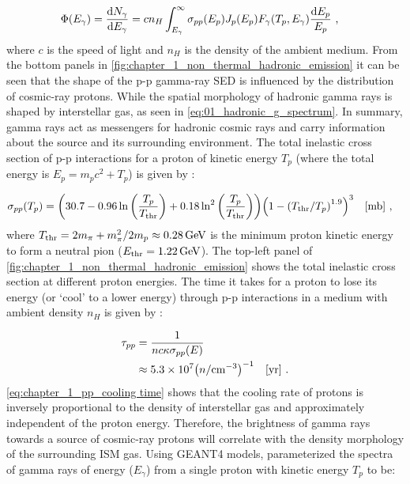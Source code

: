 \begin{equation}
    \begin{aligned}
	\Phi\qty(E_\gamma)&=\dv{N_\gamma}{E_\gamma}=cn_H\int_{E_\gamma}^\infty\sigma_{pp}\qty(E_p)J_p\qty(E_p)F_\gamma\qty(T_p,E_\gamma)\frac{\dd{E_p}}{E_p}\text{ ,}
\end{aligned} \label{eq:01_hadronic_g_spectrum}
\end{equation}
\noindent where $c$ is the speed of light and $n_H$ is the density of the ambient medium.
From the bottom panels in \autoref{fig:chapter_1_non_thermal_hadronic_emission} it can be seen that the shape of the p-p gamma-ray SED is influenced by the distribution of cosmic-ray protons. While the spatial morphology of hadronic gamma rays is shaped by interstellar gas, as seen in \autoref{eq:01_hadronic_g_spectrum}. In summary, gamma rays act as messengers for hadronic cosmic rays and carry information about the source and its surrounding environment.
\newpar
The total inelastic cross section of p-p interactions for a proton of kinetic energy $T_p$ (where the total energy is $E_p=m_pc^2+T_p$) is given by \citep{2014PhRvD..90l3014K}:

\begin{equation}
    \begin{aligned}
    \sigma_{pp}\qty(T_p) &= \qty(30.7-0.96\ln\qty(\frac{T_p}{T_\text{thr}})+0.18\ln^2\qty(\frac{T_p}{T_\text{thr}}))\qty(1-\qty(T_\text{thr}/T_p)^{1.9})^3\quad\qty[\si{\milli\barn}]\text{ ,}
    \end{aligned} \label{eq:chapter1_non_thermal_pp_cross_section}
\end{equation}
\noindent where $T_\text{thr}=2m_\pi + m_\pi^2/2m_p \approx 0.28\,\GeV$ is the minimum proton kinetic energy to form a neutral pion ($E_\text{thr}=1.22\,\GeV$). The top-left panel of \autoref{fig:chapter_1_non_thermal_hadronic_emission} shows the total inelastic cross section at different proton energies.
\newpar
The time it takes for a proton to lose its energy (or `cool' to a lower energy) through p-p interactions in a medium with ambient density $n_H$ is given by \citep{2009ARA&A..47..523H}:

\begin{equation}
    \begin{aligned}
	\tau_{pp} &= \frac{1}{nc\kappa\sigma_{pp}\qty(E)} \\
	&\approx 5.3\times 10^7\qty(n/\centimeterminusthree)^{-1}\quad\qty[\si{yr}]\text{ .}
\end{aligned} \label{eq:chapter_1_pp_cooling time}
\end{equation}
\noindent \autoref{eq:chapter_1_pp_cooling time} shows that the cooling rate of protons is inversely proportional to the density of interstellar gas and approximately independent of the proton energy. Therefore, the brightness of gamma rays towards a source of cosmic-ray protons will correlate with the density morphology of the surrounding ISM gas.
\newpar 
Using GEANT4 models, \cite{2014PhRvD..90l3014K} parameterized the spectra of gamma rays of energy ($E_\gamma$) from a single proton with kinetic energy $T_p$ to be:

